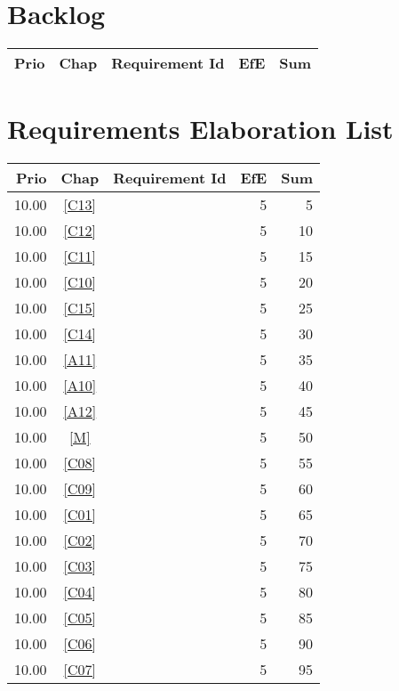 \section{Backlog}
\begin{longtable}{|r|c|p{7cm}||r|r|} \hline
\textbf{Prio} & \textbf{Chap} & \textbf{Requirement Id} & \textbf{EfE} & \textbf{Sum} \\ \hline\endhead
\end{longtable}\section{Requirements Elaboration List}
\begin{longtable}{|r|c|p{7cm}||r|r|} \hline
\textbf{Prio} & \textbf{Chap} & \textbf{Requirement Id} & \textbf{EfE} & \textbf{Sum} \\ \hline\endhead
10.00 & \ref{C13} & \nameref{C13} & 5 & 5 \\ \hline
10.00 & \ref{C12} & \nameref{C12} & 5 & 10 \\ \hline
10.00 & \ref{C11} & \nameref{C11} & 5 & 15 \\ \hline
10.00 & \ref{C10} & \nameref{C10} & 5 & 20 \\ \hline
10.00 & \ref{C15} & \nameref{C15} & 5 & 25 \\ \hline
10.00 & \ref{C14} & \nameref{C14} & 5 & 30 \\ \hline
10.00 & \ref{A11} & \nameref{A11} & 5 & 35 \\ \hline
10.00 & \ref{A10} & \nameref{A10} & 5 & 40 \\ \hline
10.00 & \ref{A12} & \nameref{A12} & 5 & 45 \\ \hline
10.00 & \ref{M} & \nameref{M} & 5 & 50 \\ \hline
10.00 & \ref{C08} & \nameref{C08} & 5 & 55 \\ \hline
10.00 & \ref{C09} & \nameref{C09} & 5 & 60 \\ \hline
10.00 & \ref{C01} & \nameref{C01} & 5 & 65 \\ \hline
10.00 & \ref{C02} & \nameref{C02} & 5 & 70 \\ \hline
10.00 & \ref{C03} & \nameref{C03} & 5 & 75 \\ \hline
10.00 & \ref{C04} & \nameref{C04} & 5 & 80 \\ \hline
10.00 & \ref{C05} & \nameref{C05} & 5 & 85 \\ \hline
10.00 & \ref{C06} & \nameref{C06} & 5 & 90 \\ \hline
10.00 & \ref{C07} & \nameref{C07} & 5 & 95 \\ \hline

\end{longtable}
